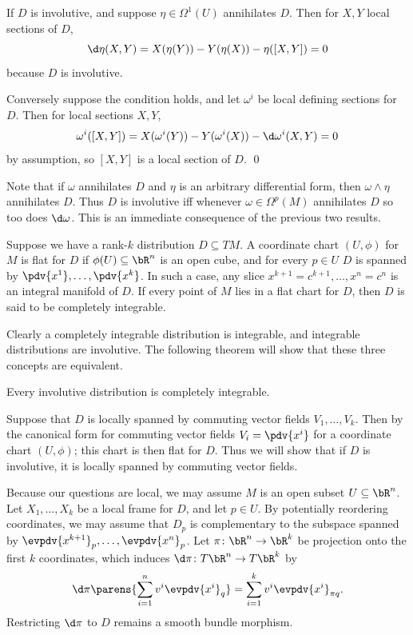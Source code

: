     If $D$ is involutive, and suppose $\eta\in\Omega^1(U)$ annihilates $D$.
    Then for $X,Y$ local sections of $D$,
    $$ \d\eta(X,Y) = X(\eta(Y)) - Y(\eta(X)) - \eta([X,Y]) = 0 $$
    because $D$ is involutive.

    Conversely suppose the condition holds, and let $\omega^i$ be local defining sections for $D$.
    Then for local sections $X,Y$,
    $$ \omega^i([X,Y]) = X(\omega^i(Y)) - Y(\omega^i(X)) - \d\omega^i(X,Y) = 0 $$
    by assumption, so $[X,Y]$ is a local section of $D$.
    \qed

\eproof

Note that if $\omega$ annihilates $D$ and $\eta$ is an arbitrary differential form, then $\omega\wedge\eta$ annihilates $D$.
Thus $D$ is involutive iff whenever $\omega\in\Omega^p(M)$ annihilates $D$ so too does $\d\omega$.
This is an immediate consequence of the previous two results.

\bdefn

    Suppose we have a rank-$k$ distribution $D\subseteq TM$.
    A coordinate chart $(U,\phi)$ for $M$ is {\emphcolor flat for $D$} if $\phi(U)\subseteq\bR^n$ is an open cube, and for every $p\in U$ $D$ is spanned by
    $\pdv{x^1},\dots,\pdv{x^k}$.
    In such a case, any slice $x^{k+1}=c^{k+1},\dots,x^n=c^n$ is an integral manifold of $D$.
    If every point of $M$ lies in a flat chart for $D$, then $D$ is said to be {\emphcolor completely integrable}.

\edefn

Clearly a completely integrable distribution is integrable, and integrable distributions are involutive.
The following theorem will show that these three concepts are equivalent.

\bthrm[name={Frobenius}]

    Every involutive distribution is completely integrable.

\ethrm

\bproof

    Suppose that $D$ is locally spanned by commuting vector fields $V_1,\dots,V_k$.
    Then by the canonical form for commuting vector fields $V_i=\pdv{x^i}$ for a coordinate chart $(U,\phi)$; this chart is then flat for $D$.
    Thus we will show that if $D$ is involutive, it is locally spanned by commuting vector fields.

    Because our questions are local, we may assume $M$ is an open subset $U\subseteq\bR^n$.
    Let $X_1,\dots,X_k$ be a local frame for $D$, and let $p\in U$.
    By potentially reordering coordinates, we may assume that $D_p$ is complementary to the subspace spanned by $\evpdv{x^{k+1}}_p,\dots,\evpdv{x^n}_p$.
    Let $\pi\colon\bR^n\to\bR^k$ be projection onto the first $k$ coordinates, which induces $\d\pi\colon T\bR^n\to T\bR^k$ by
    $$ \d\pi\parens{\sum_{i=1}^nv^i\evpdv{x^i}_q} = \sum_{i=1}^kv^i\evpdv{x^i}_{\pi q} . $$
    Restricting $\d\pi$ to $D$ remains a smooth bundle morphism.


